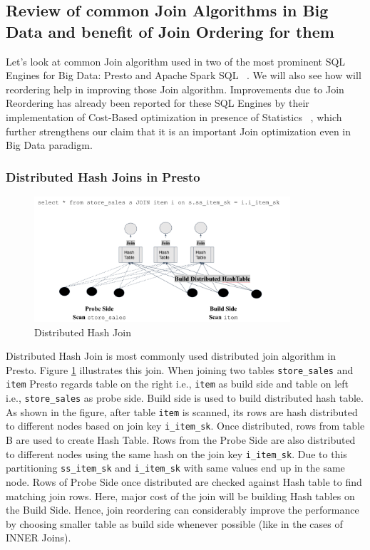 \subsection{Review of common Join Algorithms in Big Data and benefit of Join Ordering for them}
Let's look at common Join algorithm used in two of the most prominent SQL Engines for Big Data: Presto and Apache Spark SQL ~\cite{b13}. We will also see how will reordering help in improving those Join algorithm. Improvements due to Join Reordering has already been reported for these SQL Engines by their implementation of Cost-Based optimization in presence of Statistics ~\cite{b2}, which further strengthens our claim that it is an important Join optimization even in Big Data paradigm.

\subsubsection{Distributed Hash Joins in Presto}

\begin{figure}[ht]
\centerline{\includegraphics[width=9.5cm]{fig/DistributedHashJoin.png}}
\caption{Distributed Hash Join}
\label{distributed_hash_join}
\end{figure}

Distributed Hash Join is most commonly used distributed join algorithm in Presto.
Figure \ref{distributed_hash_join} illustrates this join.
When joining two tables \texttt{store\_sales} and \texttt{item} Presto regards table on the right i.e., \texttt{item} as build side and table on left i.e., \texttt{store\_sales} as probe side.
Build side is used to build distributed hash table. As shown in the figure, after table \texttt{item} is scanned, its rows are hash distributed to different nodes based on join key \texttt{i\_item\_sk}. Once distributed, rows from table B are used to create Hash Table. Rows from the Probe Side are also distributed to different nodes using the same hash on the join key \texttt{i\_item\_sk}. Due to this partitioning \texttt{ss\_item\_sk}  and \texttt{i\_item\_sk} with same values end up in the same node.  Rows of Probe Side once distributed are checked against Hash table to find matching join rows. Here, major cost of the join will be building Hash tables on the Build Side. Hence, join reordering can considerably improve the performance by choosing smaller table as build side whenever possible (like in the cases of INNER Joins).

